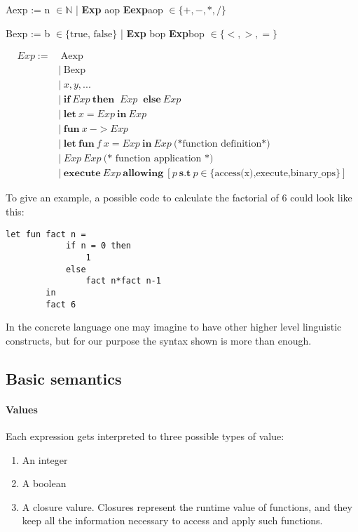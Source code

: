 \documentclass{article}
\begin{document}
    \begin{center}
        \scriptsize
        Aexp := n $\in \mathbb{N}$ | \textbf{Exp} aop \textbf{Eexp}\quad aop $\in \{+,-,*,/\}$ 
        
        \vspace{10pt}
        Bexp := b $\in \{\text{true, false}\}$ | \textbf{Exp} bop \textbf{Exp}\quad bop $\in \{<, >, =\}$ 
        
        \begin{align*}
            Exp:=&\ \text{Aexp} \\
                       &|\  \text{Bexp} \\ 
                       &|\ x,y,...\\
                       &|\ \textbf{if}\ Exp\ \textbf{then }\ Exp\ \textbf{ else}\ Exp \\
                       &|\  \textbf{let}\  x = Exp\ \textbf{in}\ Exp  \\
                       &|\  \textbf{fun}\ x\ -> Exp\\
                       &|\ \textbf{let}\ \textbf{fun}\ f\  x = Exp\ \textbf{in}\ Exp\ \text{(*function definition*)}\\
                       &|\ Exp\ Exp\ \text{(* function application *)} \\
                       &|\ \textbf{execute}\ Exp\ \textbf{allowing}\ [p\ \textbf{s.t}\ p \in \{\text{access(x),execute,binary\_ops}\}]
        \end{align*}

    \end{center}  
To give an example, a possible code to calculate the  factorial of 6 could look like this:
    \begin{lstlisting}[basicstyle=\scriptsize,keywords={let, fun, if,then, else, in }]
        let fun fact n = 
            if n = 0 then
                1
            else 
                fact n*fact n-1
        in 
        fact 6
    \end{lstlisting}
In the concrete language one may imagine to have other higher level linguistic constructs, but for our purpose the syntax shown is more than enough.
\subsection{Basic semantics}

\paragraph{Values}
Each expression gets interpreted to three possible types of value:
\begin{enumerate}
    \item An integer
    \item A boolean 
    \item A closure valure. Closures represent the runtime value of functions, 
    and they keep all the information necessary to access and apply such functions.
\end{enumerate}
\end{document}
